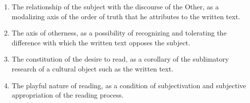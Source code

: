 \documentclass[english]{textolivre}
\begin{document}
\begin{enumerate}
    \item The relationship of the subject with the discourse of the Other, as a modalizing axis of the order of truth that he attributes to the written text.
    \item The axis of otherness, as a possibility of recognizing and tolerating the difference with which the written text opposes the subject.
    \item The constitution of the desire to read, as a corollary of the sublimatory research of a cultural object such as the written text.
    \item The playful nature of reading, as a condition of subjectivation and subjective appropriation of the reading process.
\end{enumerate}

\printbibliography\label{sec-bib}
\end{document}
